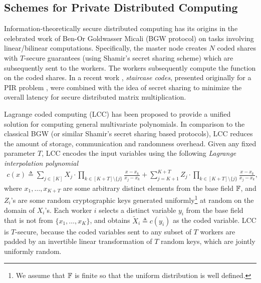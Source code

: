 


\subsection{Schemes for Private Distributed Computing}
Information-theoretically secure distributed computing has its origins in the celebrated work of Ben-Or Goldwasser Micali (BGW protocol) on tasks involving linear/bilinear computations. Specifically, the master node creates $N$ coded shares with $T$-secure guarantees (using Shamir's secret sharing scheme) which are subsequently sent to the workers. The workers subsequently compute the function on the coded shares. In a recent work \cite{Bitar-Secure-staircase}, \textit{staircase codes}, presented originally for a PIR problem \cite{bitar2018staircase}, were combined with the idea of secret sharing to minimize the overall latency for secure distributed matrix multiplication. 

Lagrange coded computing (LCC) \cite{pmlr-v89-yu19b} has been proposed to provide a unified solution for computing general multivariate polynomials. In comparison to the classical BGW (or similar Shamir's secret sharing based protocols), LCC reduces the amount of storage, communication and randomness overhead.   Given any fixed parameter $T$, LCC encodes the input variables using the following \textit{Lagrange interpolation polynomial}
\begin{align*}
    c(x)\triangleq \sum_{j\in[K]}X_j\cdot \prod_{k\in [K+T]\setminus\{j\}}\frac{x-x_k}{x_j-x_k}+
    \sum_{j=K+1}^{K+T} Z_j\cdot \prod_{k\in [K+T]\setminus\{j\}}\frac{x-x_k}{x_j-x_k},
\end{align*}
where $x_1,\ldots,x_{K+T}$ are some arbitrary distinct elements from the base field $\mathbb{F}$, and $Z_i$'s are some random cryptographic keys generated uniformly\footnote{We assume that $\mathbb{F}$ is finite so that the uniform distribution is well defined. } at random on the domain of $X_i$'s. Each worker $i$ selects a distinct variable $y_i$ from the base field that is not from $\{x_{1},\ldots,x_{K}\}$, and obtains $\tilde{X}_i\triangleq c(y_i)$ as the coded variable. LCC is $T$-secure, because the coded variables sent to any subset of $T$ workers are padded by an invertible linear transformation of $T$ random keys, which are jointly uniformly random. 
    
